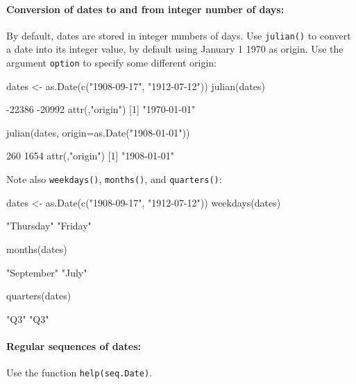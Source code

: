 \documentclass{tufte-book}\usepackage[]{graphicx}\usepackage[]{color}
\newcommand{\txtt}[1]{\texttt{#1}}
\begin{document}
\paragraph{Conversion of dates to and from integer number of days:}
By default, dates are stored in integer numbers of days.  Use
\txtt{julian()} to convert a date into its integer value, by default
using January 1 1970 as origin.  Use the argument \txtt{option}
to specify some different origin:
\begin{Schunk}
\begin{Sinput}
dates <- as.Date(c("1908-09-17", "1912-07-12"))
julian(dates)
\end{Sinput}
\begin{Soutput}
[1] -22386 -20992
attr(,"origin")
[1] "1970-01-01"
\end{Soutput}
\begin{Sinput}
julian(dates, origin=as.Date("1908-01-01"))
\end{Sinput}
\begin{Soutput}
[1]  260 1654
attr(,"origin")
[1] "1908-01-01"
\end{Soutput}
\end{Schunk}

Note also \txtt{weekdays()}, \txtt{months()}, and \txtt{quarters()}:
\begin{Schunk}
\begin{Sinput}
dates <- as.Date(c("1908-09-17", "1912-07-12"))
weekdays(dates)
\end{Sinput}
\begin{Soutput}
[1] "Thursday" "Friday"  
\end{Soutput}
\begin{Sinput}
months(dates)
\end{Sinput}
\begin{Soutput}
[1] "September" "July"     
\end{Soutput}
\begin{Sinput}
quarters(dates)
\end{Sinput}
\begin{Soutput}
[1] "Q3" "Q3"
\end{Soutput}
\end{Schunk}

\paragraph{Regular sequences of dates:}  Use the function \txtt{help(seq.Date)}.
\end{document}
